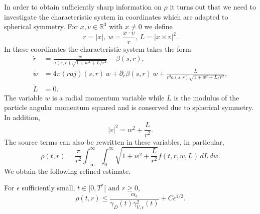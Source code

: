 \documentclass[11pt]{article}
\def\R{\mathbb R}
\begin{document}
In order to obtain sufficiently sharp information on $\rho$ it turns out that
we need to investigate the characteristic system in coordinates which are
adapted to spherical symmetry. For $x,v\in\R^3$ with $x\neq 0$ we define
\[
r=|x|,\ w=\frac{x\cdot v}{r},\ L=|x\times v|^2.
\]
In these coordinates the characteristic system takes the form
\begin{align}
  \dot r
  &=
  \frac{w}{a(s,r) \sqrt{1+w^2 +L/r^2}} - \beta(s,r),\label{dotr}\\
  \dot w
  &=
  4\pi (r a j)(s,r)\, w + \partial_r \beta(s,r)\, w +
  \frac{L}{r^3 a(s,r) \sqrt{1+w^2 +L/r^2}},\label{dotw}\\
  \dot L
  &=
  0.\label{dotL}
\end{align}
The variable $w$ is a radial momentum variable
while $L$ is the modulus of the particle angular momentum squared
and is conserved due to spherical symmetry. In addition,
\[
|v|^2 = w^2 + \frac{L}{r^2} .
\]
The source terms can also be rewritten in these variables, in particular,
\[
\rho(t,r) = \frac{\pi}{r^2}\int_{-\infty}^\infty\int_0^\infty \sqrt{1+w^2 +\frac{L}{r^2}}
f(t,r,w,L)\, dL\,dw.
\]
We obtain the following refined estimate.
%
\begin{lemma}\label{ref_rho_est}
  For $\epsilon$ sufficiently small, $t\in [0,T^\ast[$ and $r\geq 0$,
  \[
  \rho(t,r)\leq \frac{\alpha_\epsilon}{\gamma_D(t) \gamma^2_{V,\epsilon}(t)}
  + C \epsilon^{1/2}.
  \]
\end{lemma}
%
\end{document}

